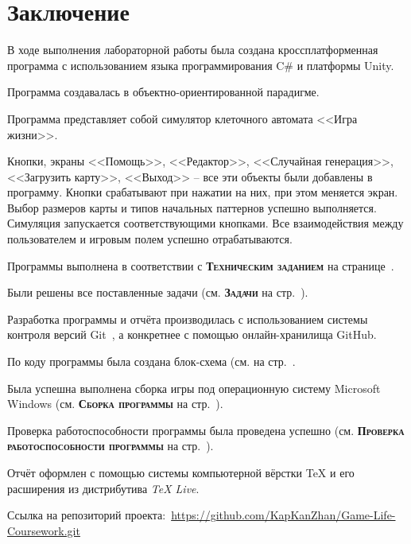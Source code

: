 \documentclass[14pt, oneside]{altsu-report}
\begin{document}



\chapter*{Заключение}
В ходе выполнения лабораторной работы была создана кроссплатформенная программа с использованием языка программирования C\# и платформы Unity.

Программа создавалась в объектно-ориентированной парадигме.

Программа представляет собой симулятор клеточного автомата <<Игра жизни>>.

Кнопки, экраны <<Помощь>>, <<Редактор>>, <<Случайная генерация>>, <<Загрузить карту>>, <<Выход>> – все эти объекты были добавлены в программу. Кнопки срабатывают при нажатии на них, при этом меняется экран. Выбор размеров карты и типов начальных паттернов успешно выполняется. Симуляция запускается соответствующими кнопками. Все взаимодействия между пользователем и игровым полем успешно отрабатываются.

Программы выполнена в соответствии с \textbf{\textsc{Техническим заданием}} на странице~\pageref{sec:ch01/sec01}.

Были решены все поставленные задачи (см. \textbf{\textsc{Задачи}} на стр.~\pageref{zadachi}).

Разработка программы и отчёта производилась с использованием системы контроля версий Git~\cite{git}, а конкретнее с помощью онлайн-хранилища GitHub.

По коду программы была создана блок-схема (см. на стр.~\pageref{fig5}.

Была успешна выполнена сборка игры под операционную систему Microsoft Windows (см. \textbf{\textsc{Сборка программы}} на стр.~\pageref{sec:ch02/sec01/sub06}).

Проверка работоспособности программы была проведена успешно (см. \textbf{\textsc{Проверка работоспособности программы}} на стр.~\pageref{sec:ch02/sec01/sub7}).

Отчёт оформлен с помощью системы компьютерной вёрстки \TeX{} и его расширения \XeTeX{} из дистрибутива \textit{TeX Live}.

Ссылка на репозиторий проекта:~\textcolor{blue}{\url{https://github.com/KapKanZhan/Game-Life-Coursework.git}}
\end{document}
